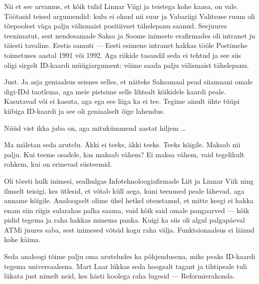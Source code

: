 Nii et see arvamus, et kõik tulid Linnar 
Viigi ja teistega kohe kaasa, on vale. Töötasid teised argumendid: kulu ei olnud nii suur ja 
Vabariigi Valitsuse ruum oli tõepoolest väga palju välismaist positiivset tähelepanu 
saanud. Seejuures teenimatut, sest nendesamade Saksa ja Soome inimeste erafirmades oli intranet ju täiesti tavaline. 
Eestis samuti --- Eesti esimene intranet hakkas tööle Postimehe toimetuses aastal 1991 või 1992. Aga riikide tasandil seda ei tehtud ja see siis oligi sirgelt ID-kaardi müügiargument: 
võime saada palju välismaist tähelepanu.


Just. Ja asja geniaalsus seisnes selles, et näiteks Saksamaal pead 
siiamaani omale digi-IDd taotlema, aga meie pistsime selle 
lihtsalt kõikidele kaardi peale. Kasutavad või ei kasuta, aga ega see liiga ka ei 
tee. Tegime ainult ühte tüüpi kiibiga ID-kaardi ja see oli geniaalselt 
õige lahendus.


Nüüd vist ikka juba on, aga mitukümmend aastat hiljem \ldots


Ma mäletan seda arutelu. Äkki ei teeks, äkki teeks. Teeks 
kõigile. Maksab nii palju. Kui teeme osadele, kas maksab vähem? Ei 
maksa vähem, vaid tegelikult rohkem, kui on erinevad süsteemid. 

Oli tõesti hulk inimesi, sealhulgas Infotehnoloogiafirmade 
Liit ja Linnar 
Viik ning ilmselt teisigi, kes ütlesid, et võtab küll aega, kuni teenused peale 
lähevad, aga anname kõigile. Analoogselt olime ühel hetkel 
otsustanud, et mitte keegi ei hakka enam siin riigis sularahas palka saama, vaid kõik said 
omale pangaarved --- kõik pidid tegema ja raha hakkas minema panka. Kuigi ka siis oli algul palgapäeval ATMi 
juures saba, sest inimesed võtsid kogu raha välja. Funktsionaalsus ei läinud kohe käima. 

Seda analoogi tõime 
palju oma aruteludes ka põhjendusena, miks peaks ID-kaardi tegema 
universaalsena. Mart Laar lükkas seda hoogsalt tagant ja tihtipeale tuli lükata just nimelt neid, kes 
hästi hoolega raha lugesid --- Reformierakonda.

